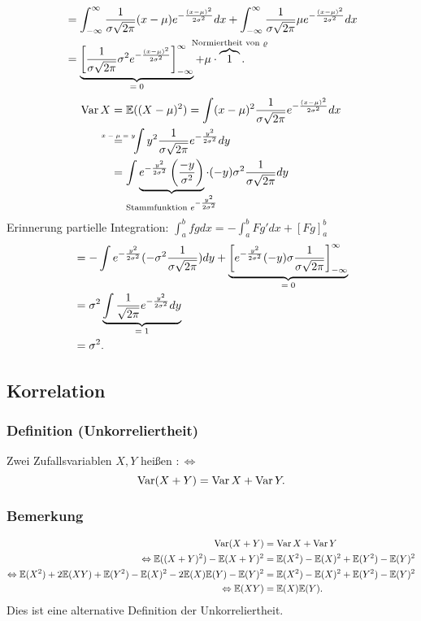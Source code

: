 {\begin{align*}
&=\int_{-\infty}^{\infty}\frac{1}{\sigma\sqrt{2\pi}}(x-\mu)e^{-\frac{(x-\mu)^2}{2\sigma^2}}dx
+\int_{-\infty}^{\infty}\frac{1}{\sigma\sqrt{2\pi}}\mu e^{-\frac{(x-\mu)^2}{2\sigma^2}}dx\\
&=\ubr{\left[\frac{1}{\sigma\sqrt{2\pi}}\sigma^2e^{-\frac{(x-\mu)^2}{2\sigma^2}}\right]_{-\infty}^\infty}{$=0$}
+\mu\cdot\obr{1}{Normiertheit von $\varrho$}.
\end{align*}
\begin{align*}
\Var X&=\mathbb{E}((X-\mu)^2)=\int(x-\mu)^2\frac{1}{\sigma\sqrt{2\pi}}e^{-\frac{(x-\mu)^2}{2\sigma^2}}dx\\
&\textabove{$x-\mu=y$}{=}\ \ \int y^2\frac{1}{\sigma\sqrt{2\pi}}e^{-\frac{y^2}{2\sigma^2}}dy\\
&=\int \ubr{e^{-\frac{y^2}{2\sigma^2}}\left(\frac{-y}{\sigma^2}\right)}{Stammfunktion $e^{-\frac{y^2}{2\sigma^2}}$}\cdot(-y)\sigma^2\frac{1}{\sigma\sqrt{2\pi}}dy\\
\end{align*}
Erinnerung partielle Integration: $\int_a^bfgdx=-\int_a^bFg'dx+[Fg]_a^b$
\begin{align*}
&=-\int e^{-\frac{y^2}{2\sigma^2}}(-\sigma^2\frac{1}{\sigma\sqrt{2\pi}})dy
+\ubr{\left[e^{-\frac{y^2}{2\sigma^2}}(-y)\sigma\frac{1}{\sigma\sqrt{2\pi}}\right]_{-\infty}^\infty}{$=0$}\\
&=\sigma^2\ubr{\int\frac{1}{\sqrt{2\pi}}e^{-\frac{y^2}{2\sigma^2}}dy}{$=1$}\\
&=\sigma^2.
\end{align*}
}
\subsection{Korrelation}
\subsubsection{Definition (Unkorreliertheit)}
Zwei Zufallsvariablen $X,Y$ hei\ss{}en  $:\Leftrightarrow$
\[
\operatorname{Var}(X+Y)=\operatorname{Var} X+\operatorname{Var} Y.
\]
\subsubsection{Bemerkung}
\begin{align*}
\operatorname{Var}(X+Y)&=\operatorname{Var} X+\operatorname{Var} Y\\
\Leftrightarrow\mathbb{E}((X+Y)^2)-\mathbb{E}(X+Y)^2&=\mathbb{E}(X^2)-\mathbb{E}(X)^2+\mathbb{E}(Y^2)-\mathbb{E}(Y)^2\\
\Leftrightarrow\mathbb{E}(X^2)+2\mathbb{E}(XY)+\mathbb{E}(Y^2)-\mathbb{E}(X)^2-2\mathbb{E}(X)\mathbb{E}(Y)-\mathbb{E}(Y)^2&=\mathbb{E}(X^2)-\mathbb{E}(X)^2+\mathbb{E}(Y^2)-\mathbb{E}(Y)^2\\
\Leftrightarrow\mathbb{E}(XY)&=\mathbb{E}(X)\mathbb{E}(Y).
\end{align*}
Dies ist eine alternative Definition der Unkorreliertheit.
